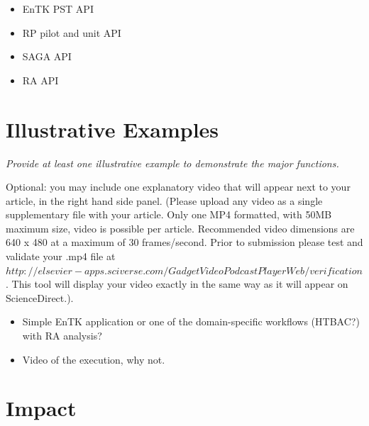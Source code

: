 \documentclass[preprint,12pt, a4paper]{elsarticle}
\begin{document}
\begin{itemize}
  \item EnTK PST API
  \item RP pilot and unit API
  \item SAGA API
  \item RA API
\end{itemize}

\section{Illustrative Examples}\label{sec:examples}

{\em Provide at least one illustrative example to demonstrate the major
functions.

Optional: you may include one explanatory video that will appear next to your
article, in the right hand side panel. (Please upload any video as a single
supplementary file with your article. Only one MP4 formatted, with 50MB
maximum size, video is possible per article. Recommended video dimensions are
640 x 480 at a maximum of 30 frames/second. Prior to submission please test
and validate your .mp4 file at $
http://elsevier-apps.sciverse.com/GadgetVideoPodcastPlayerWeb/verification$.
This tool will display your video exactly in the same way as it will appear
on ScienceDirect.).}

\begin{itemize}
  \item Simple EnTK application or one of the domain-specific workflows
  (HTBAC?) with RA analysis?
  \item Video of the execution, why not.
\end{itemize}

\section{Impact}\label{sec:impact}
\end{document}
